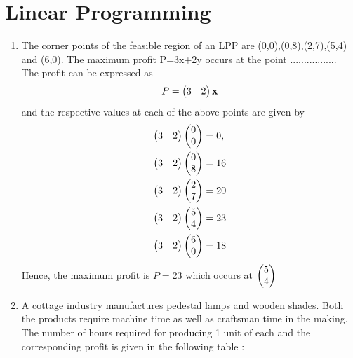 \documentclass[journal,12pt,twocolumn]{IEEEtran}
\renewcommand\thesection{\arabic{section}}
\begin{document}
 \section{Linear Programming}
\begin{enumerate}[label=\thesection.\arabic*.,ref=\thesection.\theenumi]
\item  The corner points of the feasible region of an LPP are (0,0),(0,8),(2,7),(5,4) and (6,0). The maximum profit P=3x+2y occurs at the point .................\\
	\solution The profit can be expressed as
\begin{align}
	P=\begin{pmatrix}3  & 2\end{pmatrix} \mathbf{x}
    \end{align}
    and the respective values at each of the above points are given by 
\begin{align}
	\begin{pmatrix}3  & 2\end{pmatrix}\begin{pmatrix}0\\0\end{pmatrix} &= 0,
	\\
	\begin{pmatrix}3  & 2\end{pmatrix}\begin{pmatrix}0\\8\end{pmatrix} & = 16
	\\
	\begin{pmatrix}3  & 2\end{pmatrix}\begin{pmatrix}2\\7\end{pmatrix} &= 20
	\\
	\begin{pmatrix}3  & 2\end{pmatrix}\begin{pmatrix}5\\4\end{pmatrix} &= 23
	\\
	\begin{pmatrix}3  & 2\end{pmatrix} \begin{pmatrix}6\\0\end{pmatrix} &= 18 
    \end{align}
    Hence, the maximum profit is $P = 23$ which occurs at $\begin{pmatrix}5\\4\end{pmatrix}$
\item A cottage industry manufactures pedestal lamps and wooden shades. Both the products require machine time as well as craftsman time in the making. The number of hours required for producing 1 unit of each and the corresponding profit is given in the following table :
\begin{table}[htb]
\tiny
\end{table}
\end{enumerate}
\end{document}
